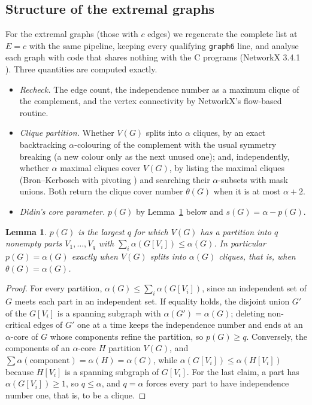 \documentclass[11pt]{article}
\newtheorem{lemma}[theorem]{Lemma}
\theoremstyle{definition}
\theoremstyle{remark}
\begin{document}
\subsection{Structure of the extremal graphs}\label{sec:structure-method}

For the extremal graphs (those with $c$ edges) we regenerate the complete list at $E=c$ with the same pipeline,
keeping every qualifying \texttt{graph6} line, and analyse each graph with code that shares nothing with the C
programs (NetworkX 3.4.1 \cite{NetworkX}). Three quantities are computed exactly.
\begin{itemize}
\item \emph{Recheck.} The edge count, the independence number as a maximum clique of the complement, and the vertex
connectivity by NetworkX's flow-based routine.
\item \emph{Clique partition.} Whether $V(G)$ splits into $\alpha$ cliques, by an exact backtracking $\alpha$-colouring
of the complement with the usual symmetry breaking (a new colour only as the next unused one); and, independently,
whether $\alpha$ maximal cliques cover $V(G)$, by listing the maximal cliques (Bron--Kerbosch with pivoting
\cite{BronKerbosch,Tomita}) and searching their $\alpha$-subsets with mask unions. Both return the clique cover number
$\theta(G)$ when it is at most $\alpha+2$.
\item \emph{Didin's core parameter.} $p(G)$ by Lemma~\ref{lem:p} below and $s(G)=\alpha-p(G)$.
\end{itemize}

\begin{lemma}\label{lem:p}
$p(G)$ is the largest $q$ for which $V(G)$ has a partition into $q$ nonempty parts $V_1,\dots,V_q$ with
$\sum_i\alpha(G[V_i])\le\alpha(G)$. In particular $p(G)=\alpha(G)$ exactly when $V(G)$ splits into $\alpha(G)$
cliques, that is, when $\theta(G)=\alpha(G)$.
\end{lemma}

\begin{proof}
For every partition, $\alpha(G)\le\sum_i\alpha(G[V_i])$, since an independent set of $G$ meets each part in an
independent set. If equality holds, the disjoint union $G'$ of the $G[V_i]$ is a spanning subgraph with
$\alpha(G')=\alpha(G)$; deleting non-critical edges of $G'$ one at a time keeps the independence number and ends at an
$\alpha$-core of $G$ whose components refine the partition, so $p(G)\ge q$. Conversely, the components of an
$\alpha$-core $H$ partition $V(G)$, and $\sum\alpha(\text{component})=\alpha(H)=\alpha(G)$, while
$\alpha(G[V_i])\le\alpha(H[V_i])$ because $H[V_i]$ is a spanning subgraph of $G[V_i]$. For the last claim, a part has
$\alpha(G[V_i])\ge1$, so $q\le\alpha$, and $q=\alpha$ forces every part to have independence number one, that is, to be
a clique.
\end{proof}
\end{document}
